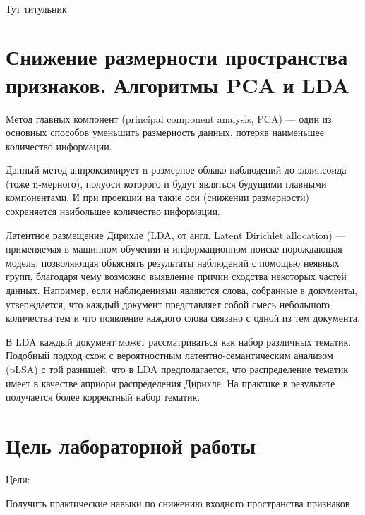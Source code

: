 \documentclass[a4paper,12pt]{article}
\begin{document}
\begin{titlepage}
\newpage

\

Тут титульник
\end{titlepage}

\newpage
\tableofcontents
\setcounter{page}{2}


\newpage\section{Снижение размерности пространства признаков. Алгоритмы PCA и LDA} 
	Метод главных компонент (principal component analysis, PCA) — один из основных способов уменьшить размерность данных, потеряв наименьшее количество информации. 
	
	\vspace{0.5cm}
	Данный метод аппроксимирует n-размерное облако наблюдений до эллипсоида (тоже n-мерного), полуоси которого и будут являться будущими главными компонентами. И при проекции на такие оси (снижении размерности) сохраняется наибольшее количество информации. 
	
	\vspace{0.5cm}
	Латентное размещение Дирихле (LDA, от англ. Latent Dirichlet allocation) — применяемая в машинном обучении и информационном поиске порождающая модель, позволяющая объяснять результаты наблюдений с помощью неявных групп, благодаря чему возможно выявление причин сходства некоторых частей данных. Например, если наблюдениями являются слова, собранные в документы, утверждается, что каждый документ представляет собой смесь небольшого количества тем и что появление каждого слова связано с одной из тем документа. 
	
	\vspace{0.5cm}
	В LDA каждый документ может рассматриваться как набор различных тематик. Подобный подход схож с вероятностным латентно-семантическим анализом (pLSA) с той разницей, что в LDA предполагается, что распределение тематик имеет в качестве априори распределения Дирихле. На практике в результате получается более корректный набор тематик.

	

\newpage\section{Цель лабораторной работы} 
	Цели: 
	\vspace{0.5cm}
	
	Получить практические навыки по снижению входного пространства признаков
	
\end{document}
